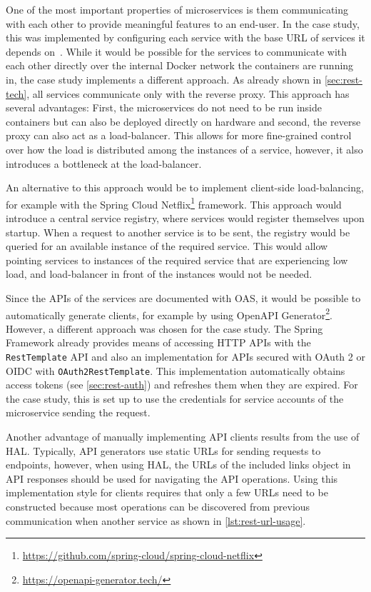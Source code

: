 One of the most important properties of microservices is them communicating with each other to provide meaningful features to an end-user.
In the case study, this was implemented by configuring each service with the base \ac{URL} of services it depends on~\cite{Taibi2020}.
While it would be possible for the services to communicate with each other directly over the internal Docker network the containers are running in, the case study implements a different approach.
As already shown in \autoref{sec:rest-tech}, all services communicate only with the reverse proxy.
This approach has several advantages:
First, the microservices do not need to be run inside containers but can also be deployed directly on hardware and second, the reverse proxy can also act as a load-balancer.
This allows for more fine-grained control over how the load is distributed among the instances of a service, however, it also introduces a bottleneck at the load-balancer.

An alternative to this approach would be to implement client-side load-balancing, for example with the Spring Cloud Netflix\footnote{\url{https://github.com/spring-cloud/spring-cloud-netflix}} framework.
This approach would introduce a central service registry, where services would register themselves upon startup.
When a request to another service is to be sent, the registry would be queried for an available instance of the required service.
This would allow pointing services to instances of the required service that are experiencing low load, and load-balancer in front of the instances would not be needed.

Since the \acp{API} of the services are documented with \ac{OAS}, it would be possible to automatically generate clients, for example by using Open\ac{API} Generator\footnote{\url{https://openapi-generator.tech/}}.
However, a different approach was chosen for the case study.
The Spring Framework already provides means of accessing \ac{HTTP} \acp{API} with the \texttt{RestTemplate} \ac{API} and also an implementation for \acp{API} secured with OAuth 2 or \ac{OIDC} with \texttt{OAuth2RestTemplate}.
This implementation automatically obtains access tokens (see \autoref{sec:rest-auth}) and refreshes them when they are expired.
For the case study, this is set up to use the credentials for service accounts of the microservice sending the request.

Another advantage of manually implementing \ac{API} clients results from the use of \ac{HAL}.
Typically, \ac{API} generators use static \acp{URL} for sending requests to endpoints, however, when using \ac{HAL}, the \acp{URL} of the included links object in \ac{API} responses should be used for navigating the \ac{API} operations.
Using this implementation style for clients requires that only a few \acp{URL} need to be constructed because most operations can be discovered from previous communication when another service as shown in \autoref{lst:rest-url-usage}.

